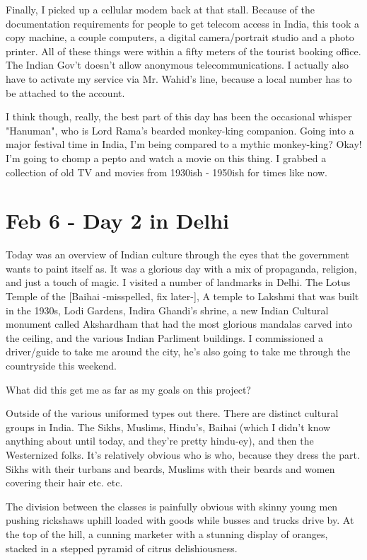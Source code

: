 \documentclass[11pt]{amsart}
\begin{document}
Finally, I picked up a cellular modem back at that stall. Because of the documentation requirements for people to get telecom access in India, this took a copy machine, a couple computers, a digital camera/portrait studio and a photo printer. All of these things were within a fifty meters of the tourist booking office. The Indian Gov't doesn't allow anonymous telecommunications. I actually also have to activate my service via Mr. Wahid's line, because a local number has to be attached to the account.

I think though, really, the best part of this day has been the occasional whisper "Hanuman", who is Lord Rama's bearded monkey-king companion. Going into a major festival time in India, I'm being compared to a mythic monkey-king? Okay! I'm going to chomp a pepto and watch a movie on this thing. I grabbed a collection of old TV and movies from 1930ish - 1950ish for times like now.

\section{Feb 6 - Day 2 in Delhi}

Today was an overview of Indian culture through the eyes that the government wants to paint itself as. It was a glorious day with a mix of propaganda, religion, and just a touch of magic. I visited a number of landmarks in Delhi. The Lotus Temple of the [Baihai -misspelled, fix later-], A temple to Lakshmi that was built in the 1930s, Lodi Gardens, Indira Ghandi's shrine, a new Indian Cultural monument called Akshardham that had the most glorious mandalas carved into the ceiling, and the various Indian Parliment buildings. I commissioned a driver/guide to take me around the city, he's also going to take me through the countryside this weekend.

What did this get me as far as my goals on this project?

Outside of the various uniformed types out there. There are distinct cultural groups in India. The Sikhs, Muslims, Hindu's, Baihai (which I didn't know anything about until today, and they're pretty hindu-ey), and then the Westernized folks. It's relatively obvious who is who, because they dress the part.  Sikhs with their turbans and beards, Muslims with their beards and women covering their hair etc. etc. 

The division between the classes is painfully obvious with skinny young men pushing rickshaws uphill loaded with goods while busses and trucks drive by. At the top of the hill, a cunning marketer with a stunning display of oranges, stacked in a stepped pyramid of citrus delishiousness.
\end{document}
